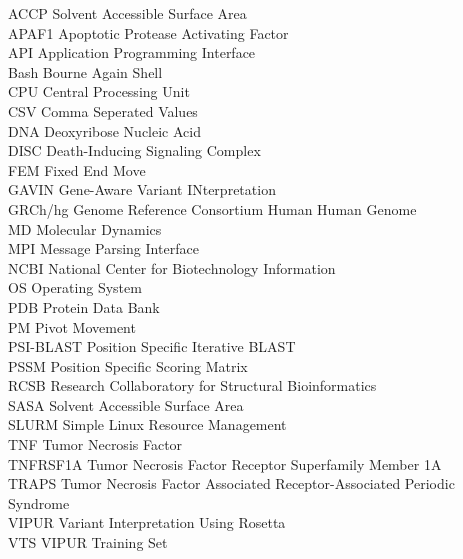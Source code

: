 ACCP Solvent Accessible Surface Area\\
APAF1 Apoptotic Protease Activating Factor\\
API Application Programming Interface\\
Bash Bourne Again Shell\\
CPU Central Processing Unit\\
CSV Comma Seperated Values\\
DNA Deoxyribose Nucleic Acid\\
DISC Death-Inducing Signaling Complex\\
FEM Fixed End Move\\
GAVIN Gene-Aware Variant INterpretation\\
GRCh/hg Genome Reference Consortium Human Human Genome\\
MD	Molecular Dynamics\\
MPI Message Parsing Interface\\
NCBI National Center for Biotechnology Information\\
OS Operating System\\
PDB Protein Data Bank\\
PM Pivot Movement\\
PSI-BLAST Position Specific Iterative BLAST\\
PSSM Position Specific Scoring Matrix\\
RCSB Research Collaboratory for Structural Bioinformatics\\
SASA Solvent Accessible Surface Area\\
SLURM Simple Linux Resource Management\\
TNF Tumor Necrosis Factor\\
TNFRSF1A Tumor Necrosis Factor Receptor Superfamily Member 1A\\
TRAPS Tumor Necrosis Factor Associated Receptor-Associated Periodic Syndrome\\
VIPUR Variant Interpretation Using Rosetta\\
VTS VIPUR Training Set\\